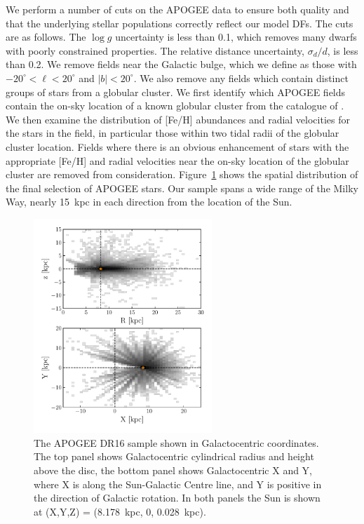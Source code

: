 We perform a number of cuts on the APOGEE data to ensure both quality and that the underlying stellar populations correctly reflect our model DFs. The cuts are as follows. The $\log g$ uncertainty is less than 0.1, which removes many dwarfs with poorly constrained properties. The relative distance uncertainty, $\sigma_{d}/d$, is less than 0.2. We remove fields near the Galactic bulge, which we define as those with $-20^{\circ} < \ell < 20^{\circ}$ and $|b| < 20^{\circ}$. We also remove any fields which contain distinct groups of stars from a globular cluster. We first identify which APOGEE fields contain the on-sky location of a known globular cluster from the catalogue of \textcite[][ The December 2010 version]{harris96}. We then examine the distribution of [Fe/H] abundances and radial velocities for the stars in the field, in particular those within two tidal radii of the globular cluster location. Fields where there is an obvious enhancement of stars with the appropriate [Fe/H] and radial velocities near the on-sky location of the globular cluster are removed from consideration. Figure~\ref{ch2:fig:APOGEELocations} shows the spatial distribution of the final selection of APOGEE stars. Our sample spans a wide range of the Milky Way, nearly 15~kpc in each direction from the location of the Sun.

\begin{figure}
	\centering
	\includegraphics[width=0.6\textwidth]{figure/ch2/APOGEEGalactocentricRzXY.pdf}
	\caption{The APOGEE DR16 sample shown in Galactocentric coordinates. The top panel shows Galactocentric cylindrical radius and height above the disc, the bottom panel shows Galactocentric X and Y, where X is along the Sun-Galactic Centre line, and Y is positive in the direction of Galactic rotation. In both panels the Sun is shown at (X,Y,Z) = (8.178~kpc, 0, 0.028~kpc).}
	\label{ch2:fig:APOGEELocations}
\end{figure}

